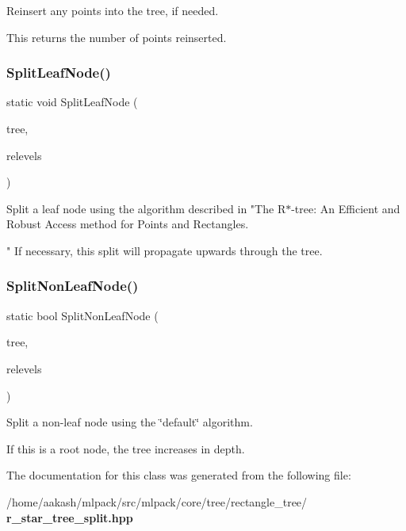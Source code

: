 Reinsert any points into the tree, if needed. 

This returns the number of points reinserted. \mbox{\label{classmlpack_1_1tree_1_1RStarTreeSplit_af73652d9536a1715364bbb0e4a9ba04e}} 
\subsubsection{Split\+Leaf\+Node()}
{\footnotesize\ttfamily static void Split\+Leaf\+Node (\begin{DoxyParamCaption}\item[{Tree\+Type $\ast$}]{tree,  }\item[{std\+::vector$<$ bool $>$ \&}]{relevels }\end{DoxyParamCaption})\hspace{0.3cm}{\ttfamily [static]}}



Split a leaf node using the algorithm described in "The R$\ast$-\/tree\+: An Efficient and Robust Access method for Points and Rectangles. 

" If necessary, this split will propagate upwards through the tree. \mbox{\label{classmlpack_1_1tree_1_1RStarTreeSplit_a73ff1eaa94449d763847fff1f537922f}} 
\subsubsection{Split\+Non\+Leaf\+Node()}
{\footnotesize\ttfamily static bool Split\+Non\+Leaf\+Node (\begin{DoxyParamCaption}\item[{Tree\+Type $\ast$}]{tree,  }\item[{std\+::vector$<$ bool $>$ \&}]{relevels }\end{DoxyParamCaption})\hspace{0.3cm}{\ttfamily [static]}}



Split a non-\/leaf node using the \char`\"{}default\char`\"{} algorithm. 

If this is a root node, the tree increases in depth. 

The documentation for this class was generated from the following file\+:\begin{DoxyCompactItemize}
\item 
/home/aakash/mlpack/src/mlpack/core/tree/rectangle\+\_\+tree/\textbf{ r\+\_\+star\+\_\+tree\+\_\+split.\+hpp}\end{DoxyCompactItemize}
